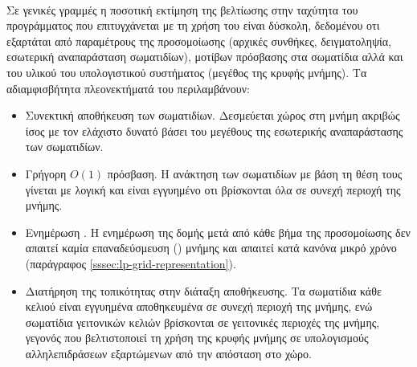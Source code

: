 \paragraph{} Σε γενικές γραμμές η ποσοτική εκτίμηση της βελτίωσης στην ταχύτητα του
προγράμματος που επιτυγχάνεται με τη χρήση του  είναι δύσκολη, δεδομένου οτι
εξαρτάται από παραμέτρους της προσομοίωσης (αρχικές συνθήκες, δειγματοληψία, εσωτερική
αναπαράσταση σωματιδίων), μοτίβων πρόσβασης στα σωματίδια αλλά και του υλικού του
υπολογιστικού συστήματος (μεγέθος της κρυφής μνήμης). Τα αδιαμφισβήτητα πλεονεκτήματά του
περιλαμβάνουν:
\begin{itemize}
\item Συνεκτική αποθήκευση των σωματιδίων. Δεσμεύεται χώρος στη μνήμη ακριβώς ίσος με τον
  ελάχιστο δυνατό βάσει του μεγέθους της εσωτερικής αναπαράστασης των σωματιδίων.
\item Γρήγορη $Ο(1)$ πρόσβαση. Η ανάκτηση των σωματιδίων με βάση τη θέση τους γίνεται με
  λογική  και είναι εγγυημένο οτι βρίσκονται όλα σε συνεχή περιοχή της
  μνήμης.
\item Ενημέρωση . Η ενημέρωση της δομής μετά από κάθε βήμα της προσομοίωσης
  δεν απαιτεί καμία επαναδεύσμευση () μνήμης και απαιτεί κατά κανόνα
  μικρό χρόνο (παράγραφος \ref{sssec:lp-grid-representation}).
\item Διατήρηση της τοπικότητας στην διάταξη αποθήκευσης. Τα σωματίδια κάθε κελιού είναι
  εγγυημένα αποθηκευμένα σε συνεχή περιοχή της μνήμης, ενώ σωματίδια γειτονικών κελιών
  βρίσκονται σε γειτονικές περιοχές της μνήμης, γεγονός που βελτιστοποιεί τη χρήση της
  κρυφής μνήμης σε υπολογισμούς αλληλεπιδράσεων εξαρτώμενων από την απόσταση στο χώρο.
\end{itemize}

